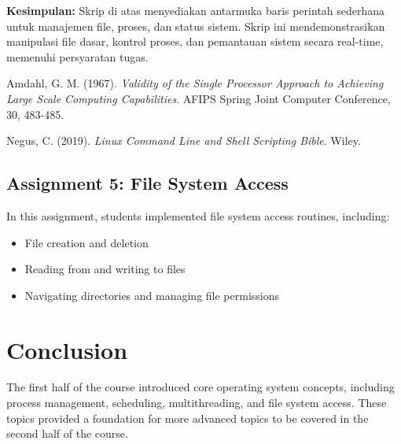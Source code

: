 \documentclass[12pt]{article}
\begin{document}
\textbf{Kesimpulan:}  
Skrip di atas menyediakan antarmuka baris perintah sederhana untuk manajemen file, proses, dan status sistem. Skrip ini mendemonstrasikan manipulasi file dasar, kontrol proses, dan pemantauan sistem secara real-time, memenuhi persyaratan tugas.

\begin{thebibliography}{9}

Amdahl, G. M. (1967). 
\textit{Validity of the Single Processor Approach to Achieving Large Scale Computing Capabilities}. 
AFIPS Spring Joint Computer Conference, 30, 483-485.

Negus, C. (2019). 
\textit{Linux Command Line and Shell Scripting Bible}. 
Wiley.

\end{thebibliography}

\subsection{Assignment 5: File System Access}
In this assignment, students implemented file system access routines, including:
\begin{itemize}
    \item File creation and deletion
    \item Reading from and writing to files
    \item Navigating directories and managing file permissions
\end{itemize}

\section{Conclusion}
The first half of the course introduced core operating system concepts, including process management, scheduling, multithreading, and file system access. These topics provided a foundation for more advanced topics to be covered in the second half of the course.
\end{document}
